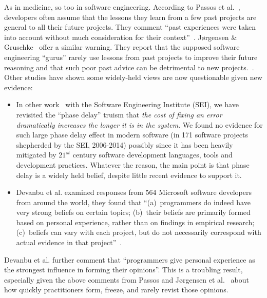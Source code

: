 \documentclass[twocolumn,5p]{elsarticle}
\newcommand{\bi}{\begin{itemize}[leftmargin=0.4cm]}
\newcommand{\ei}{\end{itemize}}
\theoremstyle{break}
\begin{document}
	As in medicine, so too in software engineering.
	According to Passos et al.~\cite{passos11},  developers often  assume that the lessons they learn from a few past projects are general to all their future projects. They comment ``past experiences were taken into account without much consideration for their context''~\cite{passos11}.  J{\o}rgensen \& Gruschke~\cite{jorgensen09} offer a similar warning. They report that the supposed software engineering ``gurus'' rarely use lessons from past projects to improve their future reasoning and that such poor past advice can be detrimental to new projects.~\cite{jorgensen09}. Other studies have shown some widely-held views are   now questionable given new evidence:
	
	\bi
	\item
	In other work~\cite{me16phase} with the Software Engineering Institute (SEI), we have revisited
	the ``phase delay'' truism that {\em the cost of fixing an error dramatically increases the longer it is in the system}. 
	We found no evidence for such large   phase delay effect in modern
	software (in 171 software projects shepherded
	by the SEI, 2006-2014) possibly since it has been  heavily mitigated by $21^{st}$ century software development languages, tools and development practices. 
	Whatever the reason, the main point  is that phase delay is a widely
	held belief, despite little recent evidence to support it.
	\item
	Devanbu et al. examined responses from 564 Microsoft software developers from around
	the world, they found that  ``(a)~programmers do indeed have very
	strong beliefs on certain topics; (b)~their beliefs are primarily formed
	based on personal experience, rather than on findings in empirical
	research; (c)~beliefs can vary with each project, but do not necessarily
	correspond with actual evidence in that project''~\cite{prem16}.
	\ei
	Devanbu et al. further  comment that ``programmers give personal experience
	as the strongest influence in forming their opinions''. This is a troubling
	result, especially given the above comments from Passos and  J{\o}rgensen et al.~\cite{passos11,jorgensen09} about how quickly practitioners form, freeze, and rarely revist those opinions.
	
\end{document}
